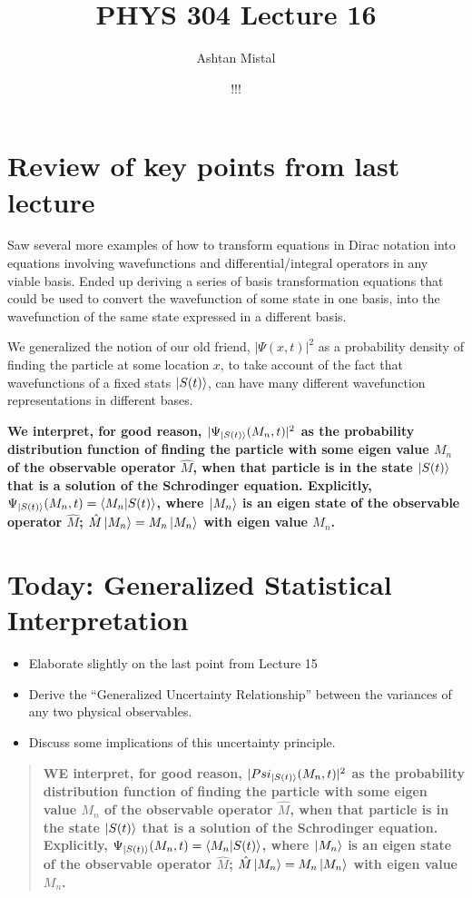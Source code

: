 \documentclass{article}
\title{PHYS 304 Lecture 16}
\author{Ashtan Mistal}
\date{!!!}
\begin{document}
\ifstandalone
\maketitle
\fi

\graphicspath{{./Lecture16/}}




\section{Review of key points from last lecture}

Saw several more examples of how to transform equations in Dirac notation into equations involving wavefunctions and differential/integral operators in any viable basis. Ended up deriving a series of basis transformation equations that could be used to convert the wavefunction of some state in one basis, into the wavefunction of the same state expressed in a different basis.

We generalized the notion of our old friend, $|\Psi(x,t)|^2$ as a probability density of finding the particle at some location $x$, to take account of the fact that wavefunctions of a fixed stats $\ket{S(t)}$, can have many different wavefunction representations in different bases. 

\textbf{We interpret, for good reason, $|\Psi_{\ket{S(t)}}(M_n,t)|^2$ as the probability distribution function of finding the particle with some eigen value $M_n$ of the observable operator $\hat{M}$, when that particle is in the state $\ket{S(t)}$ that is a solution of the Schrodinger equation. Explicitly, $\Psi_{\ket{S(t)}}(M_n,t) = \braket{M_n|S(t)}$, where $\ket{M_n}$ is an eigen state of the observable operator $\hat{M}$; $\hat{M} \ket{M_n} = M_n \ket{M_n}$ with eigen value $M_n$. }


\section{Today: Generalized Statistical Interpretation}

\begin{itemize}
    \item Elaborate slightly on the last point from Lecture 15
    \item Derive the “Generalized Uncertainty Relationship” between the variances of any two physical observables.
    \item Discuss some implications of this uncertainty principle.
\end{itemize}
\begin{quote}
    \textbf{WE interpret, for good reason, $|Psi_{\ket{S(t)}}(M_n,t)|^2$ as the probability distribution function of finding the particle with some eigen value $M_n$ of the observable operator $\hat{M}$, when that particle is in the state $\ket{S(t)}$ that is a solution of the Schrodinger equation. Explicitly, $\Psi_{\ket{S(t)}}(M_n,t) = \braket{M_n|S(t)}$, where $\ket{M_n}$ is an eigen state of the observable operator $\hat{M}$; $\hat{M} \ket{M_n} = M_n \ket{M_n}$ with eigen value $M_n$. }
\end{quote}
\end{document}
